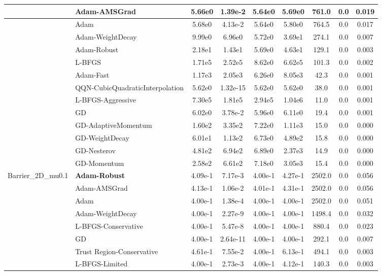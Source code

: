 \documentclass[10pt]{article}
\begin{document}
\begin{longtable}{|l|l|c|c|c|c|c|c|c|}
\hline
 & Adam-AMSGrad & 5.66e0 & 1.39e-2 & 5.64e0 & 5.69e0 & 761.0 & 0.0 & 0.019 \\
\hline
 & Adam & 5.68e0 & 4.13e-2 & 5.64e0 & 5.80e0 & 764.5 & 0.0 & 0.017 \\
\hline
 & Adam-WeightDecay & 9.99e0 & 6.96e0 & 5.72e0 & 3.69e1 & 274.1 & 0.0 & 0.007 \\
\hline
 & Adam-Robust & 2.18e1 & 1.43e1 & 5.69e0 & 4.63e1 & 129.1 & 0.0 & 0.003 \\
\hline
 & L-BFGS & 1.71e5 & 2.52e5 & 8.62e0 & 6.62e5 & 101.3 & 0.0 & 0.002 \\
\hline
 & Adam-Fast & 1.17e3 & 2.05e3 & 6.26e0 & 8.05e3 & 42.3 & 0.0 & 0.001 \\
\hline
 & QQN-CubicQuadraticInterpolation & 5.62e0 & 1.32e-15 & 5.62e0 & 5.62e0 & 38.0 & 0.0 & 0.001 \\
\hline
 & L-BFGS-Aggressive & 7.30e5 & 1.81e5 & 2.94e5 & 1.04e6 & 11.0 & 0.0 & 0.001 \\
\hline
 & GD & 6.02e0 & 3.78e-2 & 5.96e0 & 6.11e0 & 19.4 & 0.0 & 0.001 \\
\hline
 & GD-AdaptiveMomentum & 1.60e2 & 3.35e2 & 7.22e0 & 1.11e3 & 15.0 & 0.0 & 0.000 \\
\hline
 & GD-WeightDecay & 6.01e1 & 1.13e2 & 6.73e0 & 4.89e2 & 15.8 & 0.0 & 0.000 \\
\hline
 & GD-Nesterov & 4.81e2 & 6.94e2 & 6.89e0 & 2.37e3 & 14.9 & 0.0 & 0.000 \\
\hline
 & GD-Momentum & 2.58e2 & 6.61e2 & 7.18e0 & 3.05e3 & 15.4 & 0.0 & 0.000 \\
Barrier\_2D\_mu0.1 & \textbf{Adam-Robust} & 4.09e-1 & 7.17e-3 & 4.00e-1 & 4.27e-1 & 2502.0 & 0.0 & 0.056 \\
\hline
 & Adam-AMSGrad & 4.13e-1 & 1.06e-2 & 4.01e-1 & 4.31e-1 & 2502.0 & 0.0 & 0.056 \\
\hline
 & Adam & 4.00e-1 & 1.38e-4 & 4.00e-1 & 4.00e-1 & 2502.0 & 0.0 & 0.051 \\
\hline
 & Adam-WeightDecay & 4.00e-1 & 2.27e-9 & 4.00e-1 & 4.00e-1 & 1498.4 & 0.0 & 0.032 \\
\hline
 & L-BFGS-Conservative & 4.00e-1 & 5.47e-8 & 4.00e-1 & 4.00e-1 & 880.4 & 0.0 & 0.023 \\
\hline
 & GD & 4.00e-1 & 2.64e-11 & 4.00e-1 & 4.00e-1 & 292.1 & 0.0 & 0.007 \\
\hline
 & Trust Region-Conservative & 4.61e-1 & 7.55e-2 & 4.00e-1 & 6.13e-1 & 494.1 & 0.0 & 0.003 \\
\hline
 & L-BFGS-Limited & 4.00e-1 & 2.73e-3 & 4.00e-1 & 4.12e-1 & 140.3 & 0.0 & 0.003 \\

\end{longtable}
\end{document}
